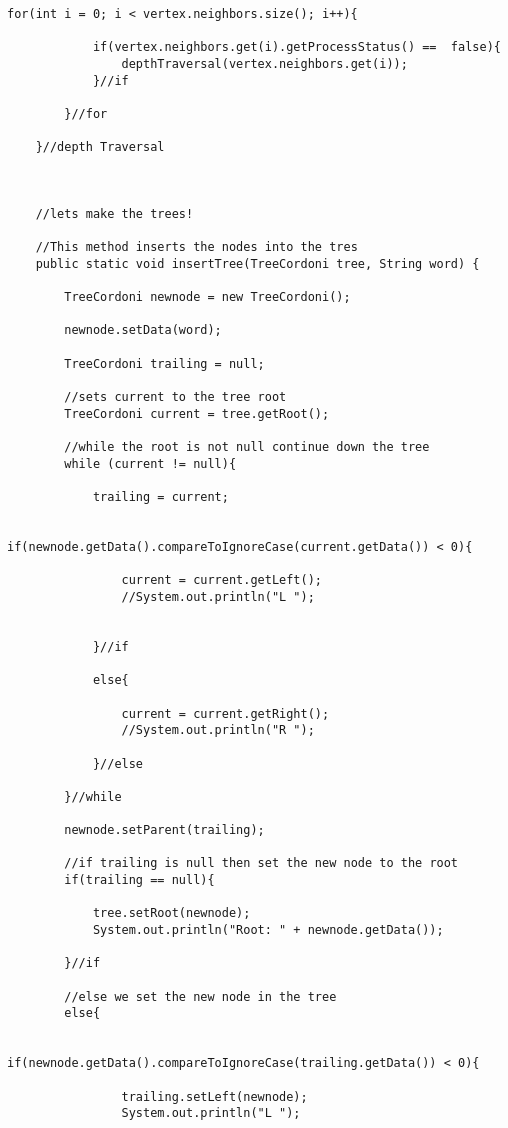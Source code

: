 \documentclass[letterpaper, 10pt,DIV=13]{scrartcl}
\numberwithin{equation}{section} %
\numberwithin{figure}{section} %
\numberwithin{table}{section} %
\begin{document}
\begin{lstlisting}[frame=single, ]
        for(int i = 0; i < vertex.neighbors.size(); i++){

            if(vertex.neighbors.get(i).getProcessStatus() ==  false){
                depthTraversal(vertex.neighbors.get(i));
            }//if

        }//for

    }//depth Traversal


    
    //lets make the trees!

    //This method inserts the nodes into the tres
    public static void insertTree(TreeCordoni tree, String word) {

        TreeCordoni newnode = new TreeCordoni();

        newnode.setData(word);

        TreeCordoni trailing = null;

        //sets current to the tree root
        TreeCordoni current = tree.getRoot();

        //while the root is not null continue down the tree
        while (current != null){

            trailing = current;

            if(newnode.getData().compareToIgnoreCase(current.getData()) < 0){

                current = current.getLeft();
                //System.out.println("L ");


            }//if

            else{

                current = current.getRight();
                //System.out.println("R ");

            }//else

        }//while

        newnode.setParent(trailing);

        //if trailing is null then set the new node to the root
        if(trailing == null){

            tree.setRoot(newnode);
            System.out.println("Root: " + newnode.getData());

        }//if

        //else we set the new node in the tree
        else{

            if(newnode.getData().compareToIgnoreCase(trailing.getData()) < 0){

                trailing.setLeft(newnode);
                System.out.println("L ");


\end{lstlisting}
\end{document}
